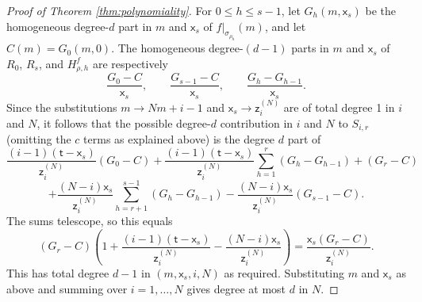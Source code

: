 \documentclass[10pt,a4paper]{amsart}
\begin{document}
\begin{proof}[Proof of Theorem \ref{thm:polynomiality}]
	For $0\le h\le s-1$, let $G_h(m,\mathsf{x}_s)$ be the homogeneous degree-$d$ part in $m$ and $\mathsf{x}_s$ of $f|_{\sigma_{\rho_h}}(m)$, and let $C(m)=G_0(m,0)$. The homogeneous degree-$(d-1)$ parts in $m$ and $\mathsf{x}_s$ of $R_0$, $R_s$, and $H_{\rho,h}^f$ are respectively
	\[
		\frac{G_0-C}{\mathsf{x}_s},\qquad \frac{G_{s-1}-C}{\mathsf{x}_s},\qquad \frac{G_h-G_{h-1}}{\mathsf{x}_s}.
	\]
	Since the substitutions $m\to Nm+i-1$ and $\mathsf{x}_s\to \mathsf{z}_i^{(N)}$ are of total degree 1 in $i$ and $N$, it follows that the
	possible degree-$d$ contribution in $i$ and $N$ to $S_{i,r}$ (omitting the $c$ terms as explained above) is
	the degree $d$ part of
	\[
		\frac{(i-1)(\mathsf{t}-\mathsf{x}_s)}{\mathsf{z}_i^{(N)}}(G_0-C)
		+\frac{(i-1)(\mathsf{t}-\mathsf{x}_s)}{\mathsf{z}_i^{(N)}}\sum_{h=1}^r(G_h-G_{h-1})
		+(G_r-C)
	\]
	\[
		+\frac{(N-i)\mathsf{x}_s}{\mathsf{z}_i^{(N)}}\sum_{h=r+1}^{s-1}(G_h-G_{h-1})
		-\frac{(N-i)\mathsf{x}_s}{\mathsf{z}_i^{(N)}}(G_{s-1}-C).
	\]
	The sums telescope, so this equals
	\[
		(G_r-C)\left(1+\frac{(i-1)(\mathsf{t}-\mathsf{x}_s)}{\mathsf{z}_i^{(N)}}-\frac{(N-i)\mathsf{x}_s}{\mathsf{z}_i^{(N)}}\right)
		=\frac{\mathsf{x}_s(G_r-C)}{\mathsf{z}_i^{(N)}}.
	\]
	This has total degree $d-1$ in $(m,\mathsf{x}_s,i,N)$ as required. Substituting $m$ and $\mathsf{x}_s$ as above and summing over $i=1,\dots,N$ gives degree at most $d$ in $N$.
\end{proof}
\end{document}
